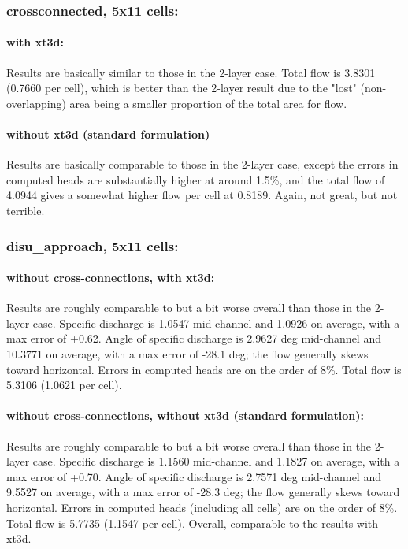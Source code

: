 \documentclass{article}
\begin{document}
\subsubsection{crossconnected, 5x11 cells:}

\paragraph{with xt3d:} Results are basically similar to those in the 2-layer case. Total flow is 3.8301 (0.7660 per cell), which is better than the 2-layer result due to the "lost" (non-overlapping) area being a smaller proportion of the total area for flow.

\paragraph{without xt3d (standard formulation)}  Results are basically comparable to those in the 2-layer case, except the errors in computed heads are substantially higher at around 1.5\%, and the total flow of 4.0944 gives a somewhat higher flow per cell at 0.8189. Again, not great, but not terrible.

\subsubsection{disu\_approach, 5x11 cells:}

\paragraph{without cross-connections, with xt3d:} Results are roughly comparable to but a bit worse overall than those in the 2-layer case. Specific discharge is 1.0547 mid-channel and 1.0926 on average, with a max error of +0.62. Angle of specific discharge is 2.9627 deg mid-channel and 10.3771 on average, with a max error of -28.1 deg; the flow generally skews toward horizontal. Errors in computed heads are on the order of 8\%. Total flow is 5.3106 (1.0621 per cell).

\paragraph{without cross-connections, without xt3d (standard formulation):} Results are roughly comparable to but a bit worse overall than those in the 2-layer case. Specific discharge is 1.1560 mid-channel and 1.1827 on average, with a max error of +0.70. Angle of specific discharge is 2.7571 deg mid-channel and 9.5527 on average, with a max error of -28.3 deg; the flow generally skews toward horizontal. Errors in computed heads (including all cells) are on the order of 8\%. Total flow is 5.7735 (1.1547 per cell). Overall, comparable to the results with xt3d.
\end{document}
